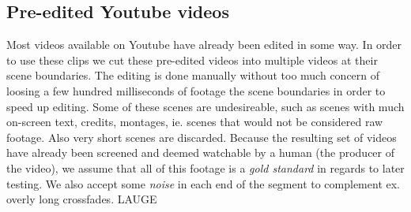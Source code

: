 \subsection{Pre-edited Youtube videos}
%
Most videos available on Youtube have already been edited in some way. 
In order to use these clips we cut these pre-edited videos into multiple videos at their scene boundaries. The editing is done manually without too much concern of loosing a few hundred milliseconds of footage the scene boundaries in order to speed up editing. Some of these scenes are undesireable, such as scenes with much on-screen text, credits, montages, ie. scenes that would not be considered raw footage. Also very short scenes are discarded. Because the resulting set of videos have already been screened and deemed watchable by a human (the producer of the video), we assume that all of this footage is a \textit{gold standard} in regards to later testing.
%
We also accept some \textit{noise} in each end of the segment to complement ex. overly long crossfades. LAUGE %
%
